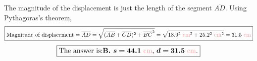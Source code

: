 \documentclass[A4,12pt]{article}
\begin{document}
\begin{enumerate}[label=\bfseries (\arabic*)]
\begin{example}
\begin{equation*}
\end{equation*}
The magnitude of the displacement is just the length of the segment $\overline{AD}$. Using Pythagoras's theorem,
\begin{equation*}
    \boxed{\text{Magnitude of displacement}=\overline{AD}=\sqrt{(\overline{AB}+\overline{CD})^2+\overline{BC}^2}=\sqrt{\cmcgs{18.9^2}^2+\cmcgs{25.2^2}^2}=\cmcgs{31.5}}
\end{equation*}
\begin{equation*}
    \boxed{\text{The answer is:} \textbf{B. } \bm{s=\cmcgs{44.1}}\text{, }\bm{d=\cmcgs{31.5}}.}
\end{equation*}
\end{example}




















\end{enumerate}
\end{document}
